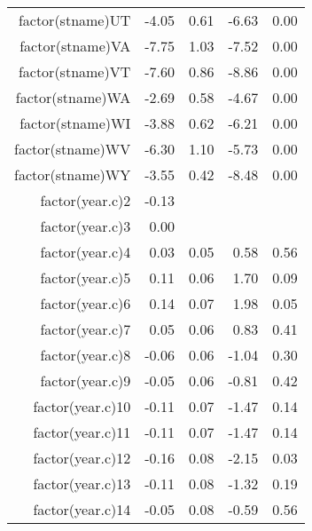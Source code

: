 \begin{table}[ht]
\begin{tabular}{rrrrr}
  factor(stname)UT & -4.05 & 0.61 & -6.63 & 0.00 \\ 
  factor(stname)VA & -7.75 & 1.03 & -7.52 & 0.00 \\ 
  factor(stname)VT & -7.60 & 0.86 & -8.86 & 0.00 \\ 
  factor(stname)WA & -2.69 & 0.58 & -4.67 & 0.00 \\ 
  factor(stname)WI & -3.88 & 0.62 & -6.21 & 0.00 \\ 
  factor(stname)WV & -6.30 & 1.10 & -5.73 & 0.00 \\ 
  factor(stname)WY & -3.55 & 0.42 & -8.48 & 0.00 \\ 
  factor(year.c)2 & -0.13 &  &  &  \\ 
  factor(year.c)3 & 0.00 &  &  &  \\ 
  factor(year.c)4 & 0.03 & 0.05 & 0.58 & 0.56 \\ 
  factor(year.c)5 & 0.11 & 0.06 & 1.70 & 0.09 \\ 
  factor(year.c)6 & 0.14 & 0.07 & 1.98 & 0.05 \\ 
  factor(year.c)7 & 0.05 & 0.06 & 0.83 & 0.41 \\ 
  factor(year.c)8 & -0.06 & 0.06 & -1.04 & 0.30 \\ 
  factor(year.c)9 & -0.05 & 0.06 & -0.81 & 0.42 \\ 
  factor(year.c)10 & -0.11 & 0.07 & -1.47 & 0.14 \\ 
  factor(year.c)11 & -0.11 & 0.07 & -1.47 & 0.14 \\ 
  factor(year.c)12 & -0.16 & 0.08 & -2.15 & 0.03 \\ 
  factor(year.c)13 & -0.11 & 0.08 & -1.32 & 0.19 \\ 
  factor(year.c)14 & -0.05 & 0.08 & -0.59 & 0.56 \\ 
   \hline
\end{tabular}
\end{table}
